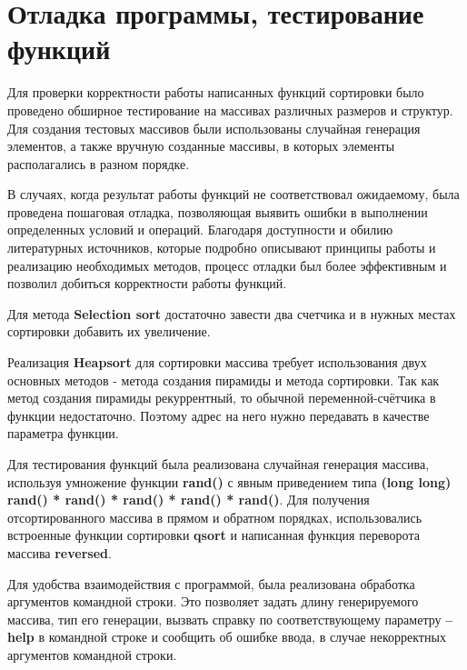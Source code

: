 \documentclass[a4paper,12pt,titlepage,finall]{article}
\begin{document}
\section{Отладка программы, тестирование функций}

Для проверки корректности работы написанных функций сортировки было проведено обширное тестирование на массивах различных размеров и структур. Для создания тестовых массивов были использованы случайная генерация элементов, а также вручную созданные массивы, в которых элементы располагались в разном порядке.\par

В случаях, когда результат работы функций не соответствовал ожидаемому, была проведена пошаговая отладка, позволяющая выявить ошибки в выполнении определенных условий и операций. Благодаря доступности и обилию литературных источников, которые подробно описывают принципы работы и реализацию необходимых методов, процесс отладки был более эффективным и позволил добиться корректности работы функций.\par

Для метода \textbf{Selection sort} достаточно завести два счетчика и в нужных местах сортировки добавить их увеличение.\par

Реализация  \textbf{Heapsort} для сортировки массива требует использования двух основных методов - метода создания пирамиды и метода сортировки. Так как метод создания пирамиды рекуррентный, то обычной переменной-счётчика в функции недостаточно. Поэтому адрес на него нужно передавать в качестве параметра функции.\par

Для тестирования функций была реализована случайная генерация массива, используя умножение функции \textbf{rand()} с явным приведением типа  \textbf{(long long) rand() * rand() * rand() * rand() * rand()}. Для получения отсортированного массива в прямом и обратном порядках, использовались встроенные функции сортировки \textbf{qsort} и написанная функция переворота массива \textbf{reversed}.\par

Для удобства взаимодействия с программой, была реализована обработка аргументов командной строки. Это позволяет задать длину генерируемого массива, тип его генерации, вызвать справку по соответствующему параметру \textbf{--help} в командной строке и сообщить об ошибке ввода, в случае некорректных аргументов командной строки.\par
\end{document}
